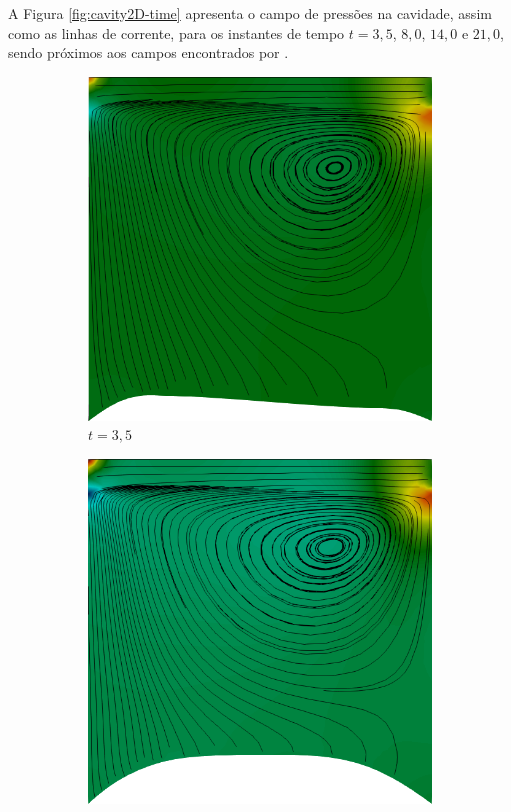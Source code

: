 A Figura \ref{fig:cavity2D-time} apresenta o campo de pressões na cavidade, assim como as linhas de corrente, para os instantes de tempo $t=3,5$, $8,0$, $14,0$ e $21,0$, sendo próximos aos campos encontrados por .

\begin{figure}[h!]
    \centering
    \caption{Cavidade bidimensional - Campo de pressões e linhas de corrente na cavidade.}
    \begin{subfigure}[b]{0.3\textwidth}
        \includegraphics[width=\linewidth]{Figuras/FSI-Cavity2D/t3_5.png}
        \caption{$t=3,5$}
    \end{subfigure}
    \begin{subfigure}[b]{0.3\textwidth}
        \includegraphics[width=\linewidth]{Figuras/FSI-Cavity2D/t8.png}

\end{subfigure}
\end{figure}
